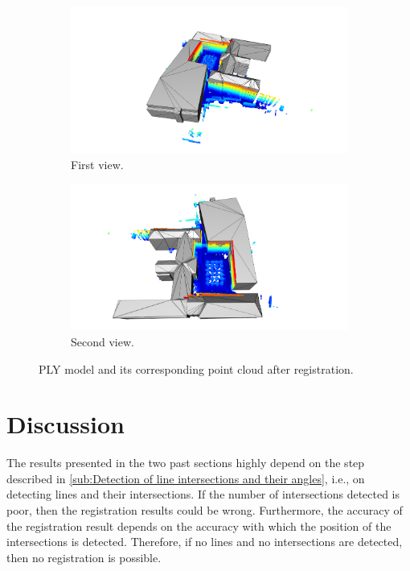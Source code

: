         \begin{figure}[htp]
            \centering
            \begin{subfigure}{1\textwidth}
                \centering
                \includegraphics[scale=0.15]{images/solution_images/final_ply_a.png}
                \caption{First view.}
                \label{fig:final_ply_a}
            \end{subfigure}
            \hfill
            \begin{subfigure}{1\textwidth}
                \centering
                \includegraphics[scale=0.15]{images/solution_images/final_ply_b.png}
                \caption{Second view.}
                \label{fig:final_ply_b}
            \end{subfigure}
            \caption{PLY model and its corresponding point cloud after registration.}
            \label{fig:final_ply}
        \end{figure}

    \section{Discussion}
        The results presented in the two past sections highly depend on the step described in 
        \autoref{sub:Detection of line intersections and their angles}, i.e., on detecting lines and their intersections.
        If the number of intersections detected is poor, then the registration results could be wrong.
        Furthermore, the accuracy of the registration result depends on the accuracy with which the position of the intersections is detected.
        Therefore, if no lines and no intersections are detected, then no registration is possible.


